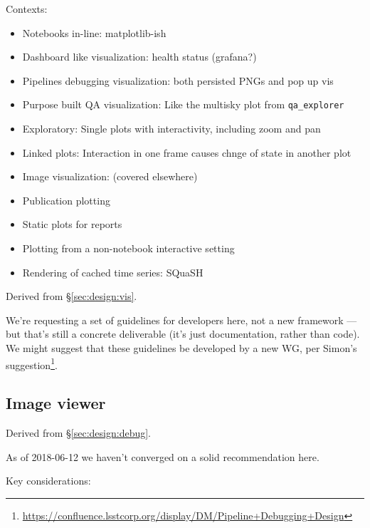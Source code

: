 Contexts:
\begin{itemize}
\item Notebooks in-line: matplotlib-ish
\item Dashboard like visualization: health status (grafana?)
\item Pipelines debugging visualization: both persisted PNGs and pop up vis
\item Purpose built QA visualization: Like the multisky plot from \texttt{qa\_explorer}
\item Exploratory: Single plots with interactivity, including zoom and pan
\item Linked plots: Interaction in one frame causes chnge of state in another plot
\item Image visualization: (covered elsewhere)
\item Publication plotting
\item Static plots for reports
\item Plotting from a non-notebook interactive setting
\item Rendering of cached time series: SQuaSH
\end{itemize}

Derived from \S\ref{sec:design:vis}.

We're requesting a set of guidelines for developers here, not a new framework
--- but that's still a concrete deliverable (it's just documentation, rather
than code). We might suggest that these guidelines be developed by a new WG,
per Simon's
suggestion\footnote{\url{https://confluence.lsstcorp.org/display/DM/Pipeline+Debugging+Design}}.

\subsection{Image viewer}


Derived from \S\ref{sec:design:debug}.

As of 2018-06-12 we haven't converged on a solid recommendation here.

Key considerations:

